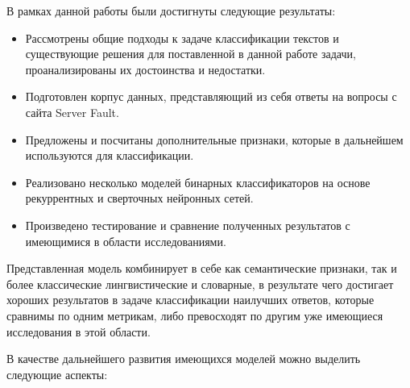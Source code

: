 \documentclass[../diploma.tex]{subfiles}
\begin{document}
	\label{sec:conclusion}

	В рамках данной работы были достигнуты следующие результаты:

	\begin{itemize}
		\item
		Рассмотрены общие подходы к задаче классификации текстов и существующие решения для поставленной в данной работе задачи, проанализированы их достоинства и недостатки.
		                                                                                                                      			
		\item
		Подготовлен корпус данных, представляющий из себя ответы на вопросы с сайта Server Fault.

		\item
		Предложены и посчитаны дополнительные признаки, которые в дальнейшем используются для классификации.

		\item
		Реализовано несколько моделей бинарных классификаторов на основе рекуррентных и сверточных нейронных сетей.

		\item
		Произведено тестирование и сравнение полученных результатов с имеющимися в области исследованиями.

	\end{itemize}

	Представленная модель комбинирует в себе как семантические признаки, так и более классические лингвистические и словарные, 
	в результате чего достигает хороших результатов в задаче классификации наилучших ответов, 
	которые сравнимы по одним метрикам, либо превосходят по другим уже имеющиеся исследования в этой области.

	В качестве дальнейшего развития имеющихся моделей можно выделить следующие аспекты:
\end{document}
